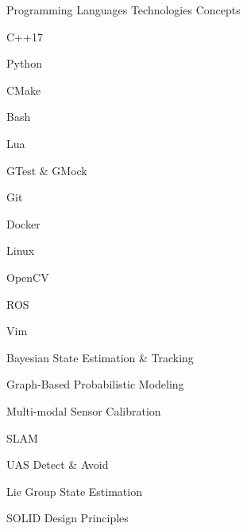 
\begin{cventries}

  \cventrycol
  {Programming Languages}
  {Technologies}
  {Concepts}
  {
    \begin{cvitems}
      \item {C++17}
      \item {Python}
      \item {CMake}
      \item {Bash}
      \item {Lua}
    \end{cvitems}
  }
  {
    \begin{cvitems}
      \item {GTest \& GMock}
      \item {Git}
      \item {Docker}
      \item {Linux}
      \item {OpenCV}
      \item {ROS}
      \item {Vim}
    \end{cvitems}
  }
  {
    \begin{cvitems}
      \item {Bayesian State Estimation \& Tracking}
      \item {Graph-Based Probabilistic Modeling}
      \item {Multi-modal Sensor Calibration}
      \item {SLAM}
      \item {UAS Detect \& Avoid}
      \item {Lie Group State Estimation}
      \item {SOLID Design Principles}
    \end{cvitems}
  }

\end{cventries}
